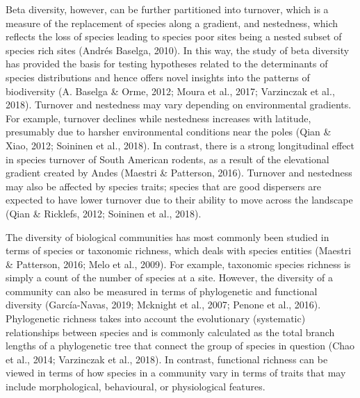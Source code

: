 \documentclass{article}
\begin{document}
\vspace{5mm}

Beta diversity, however, can be further partitioned into turnover, which is a measure of the replacement of species along a gradient, and nestedness, which reflects the loss of species leading to species poor sites being a nested subset of species rich sites (Andrés Baselga, 2010). In this way, the study of beta diversity has provided the basis for testing hypotheses related to the determinants of species distributions and hence offers novel insights into the patterns of biodiversity (A. Baselga \& Orme, 2012; Moura et al., 2017; Varzinczak et al., 2018). Turnover and nestedness may vary depending on environmental gradients. For example, turnover declines while nestedness increases with latitude, presumably due to harsher environmental conditions near the poles (Qian \& Xiao, 2012; Soininen et al., 2018). In contrast, there is a strong longitudinal effect in species turnover of South American rodents, as a result of the elevational gradient created by Andes (Maestri \& Patterson, 2016). Turnover and nestedness may also be affected by species traits;  species that are good dispersers are expected to have lower turnover due to their ability to move across the landscape (Qian \& Ricklefs, 2012; Soininen et al., 2018). 

\vspace{5mm}

The diversity of biological communities has most commonly been studied in terms of species or taxonomic richness, which deals with species entities (Maestri \& Patterson, 2016; Melo et al., 2009). For example, taxonomic species richness is simply a count of the number of species at a site. However, the diversity of a community can also be measured in terms of phylogenetic and functional diversity (García-Navas, 2019; Mcknight et al., 2007; Penone et al., 2016). Phylogenetic richness takes into account the evolutionary (systematic) relationships between species and is commonly calculated as the total branch lengths of a phylogenetic tree that connect the group of species in question (Chao et al., 2014; Varzinczak et al., 2018). In contrast, functional richness can be viewed in terms of how species in a community vary in terms of traits that may include morphological, behavioural, or physiological features. 

\vspace{5mm}
\end{document}
